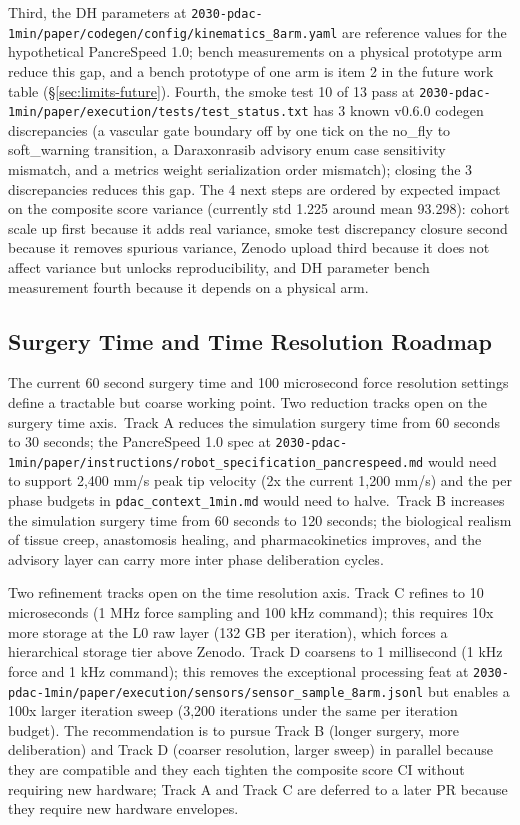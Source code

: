Third, the DH parameters at
\texttt{2030-pdac-1min/paper/codegen/config/kinematics_8arm.yaml}
are reference values for the hypothetical PancreSpeed 1.0; bench
measurements on a physical prototype arm reduce this gap, and a
bench prototype of one arm is item 2 in the future work table
(\S \ref{sec:limits-future}). Fourth, the smoke test 10 of 13
pass at \texttt{2030-pdac-1min/paper/execution/tests/test_status.txt}
has 3 known v0.6.0 codegen discrepancies (a vascular gate
boundary off by one tick on the no_fly to soft_warning transition,
a Daraxonrasib advisory enum case sensitivity mismatch, and a
metrics weight serialization order mismatch); closing the 3
discrepancies reduces this gap. The 4 next steps are ordered by
expected impact on the composite score variance (currently std
1.225 around mean 93.298): cohort scale up first because it adds
real variance, smoke test discrepancy closure second because it
removes spurious variance, Zenodo upload third because it does
not affect variance but unlocks reproducibility, and DH parameter
bench measurement fourth because it depends on a physical arm.

\subsection{Surgery Time and Time Resolution Roadmap}
\label{sec:limits-resolution}

The current 60 second surgery time and 100 microsecond force
resolution settings define a tractable but coarse working point. Two
reduction tracks open on the surgery time axis.\ Track A reduces
the simulation surgery time from 60 seconds to 30 seconds; the
PancreSpeed 1.0 spec at
\texttt{2030-pdac-1min/paper/instructions/robot_specification_pancrespeed.md}
would need to support 2,400 mm/s peak tip velocity (2x the current
1,200 mm/s) and the per phase budgets in
\texttt{pdac_context_1min.md} would need to halve.\ Track B
increases the simulation surgery time from 60 seconds to 120
seconds; the biological realism of tissue creep, anastomosis
healing, and pharmacokinetics improves, and the advisory layer
can carry more inter phase deliberation cycles.

Two refinement tracks open on the time resolution axis. Track C
refines to 10 microseconds (1 MHz force sampling and 100 kHz
command); this requires 10x more storage at the L0 raw layer
(132 GB per iteration), which forces a hierarchical storage tier
above Zenodo. Track D coarsens to 1 millisecond (1 kHz force and
1 kHz command); this removes the exceptional processing feat at
\texttt{2030-pdac-1min/paper/execution/sensors/sensor_sample_8arm.jsonl}
but enables a 100x larger iteration sweep (3,200 iterations under
the same per iteration budget). The recommendation is to pursue
Track B (longer surgery, more deliberation) and Track D (coarser
resolution, larger sweep) in parallel because they are compatible
and they each tighten the composite score CI without requiring
new hardware; Track A and Track C are deferred to a later PR
because they require new hardware envelopes.


